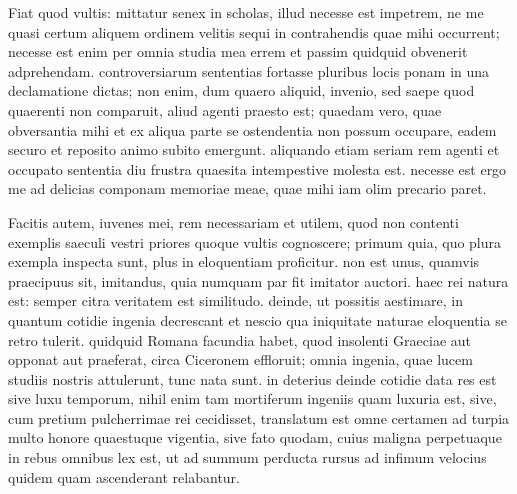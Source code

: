 Fiat quod vultis: mittatur senex in scholas, illud necesse est impetrem, ne me quasi certum aliquem ordinem velitis sequi in contrahendis quae mihi occurrent; necesse est enim per omnia studia mea errem et passim quidquid obvenerit adprehendam. controversiarum sententias fortasse pluribus locis ponam in una declamatione dictas; non enim, dum quaero aliquid, invenio, sed saepe quod quaerenti non comparuit, aliud agenti praesto est; quaedam vero, quae obversantia mihi et ex aliqua parte se ostendentia non possum occupare, eadem securo et reposito animo subito emergunt. aliquando etiam seriam rem agenti et occupato sententia diu frustra quaesita intempestive molesta est. necesse est ergo me ad delicias componam memoriae meae, quae mihi iam olim precario paret.

Facitis autem, iuvenes mei, rem necessariam et utilem, quod non contenti exemplis saeculi vestri priores quoque vultis cognoscere; primum quia, quo plura exempla inspecta sunt, plus in eloquentiam proficitur. non est unus, quamvis praecipuus sit, imitandus, quia numquam par fit imitator auctori. haec rei natura est: semper citra veritatem est similitudo. deinde, ut possitis aestimare, in quantum cotidie ingenia decrescant et nescio qua iniquitate naturae eloquentia se retro tulerit. quidquid Romana facundia habet, quod insolenti Graeciae aut opponat aut praeferat, circa Ciceronem effloruit; omnia ingenia, quae lucem studiis nostris attulerunt, tunc nata sunt. in deterius deinde cotidie data res est sive luxu temporum‚ nihil enim tam mortiferum ingeniis quam luxuria est‚ sive, cum pretium pulcherrimae rei cecidisset, translatum est omne certamen ad turpia multo honore quaestuque vigentia, sive fato quodam, cuius maligna perpetuaque in rebus omnibus lex est, ut ad summum perducta rursus ad infimum velocius quidem quam ascenderant relabantur.


